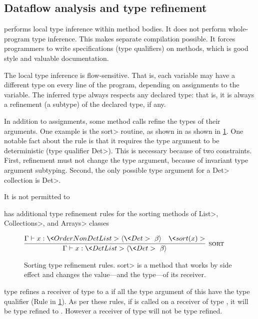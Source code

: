 \subsection{Dataflow analysis and type refinement}\label{dataflow}
\TheDeterminismChecker performs local type inference within method bodies.
It does not perform whole-program type inference.
This makes separate compilation possible.
It forces programmers to write specifications (type qualifiers) on methods,
which is good style and valuable documentation.

The local type inference is flow-sensitive.  That is, each variable may
have a different type on every line of the program, depending on
assignments to the variable.  The inferred type always respects any
declared type:  that is, it is always a refinement (a subtype) of the
declared type, if any.

In addition to assignments, some method calls refine the types of their
arguments.  One example is the \<sort> routine, as shown in 
as shown in \cref{fig-sorting}.  One notable fact about the 
rule is that it requires the type argument to be deterministic (type
qualifier \<Det>).  This is necessary because of two constraints.
First, refinement must not change the type argument, because of invariant
type argument subtyping.
Second, the only possible type argument for a \<Det> collection is \<Det>.


It is not permitted to 




\TheDeterminismChecker has additional type refinement rules for the sorting
methods of \<List>, \<Collections>, and \<Arrays> classes
\begin{figure}
%     
    
  $\infer[\rulename{sort}]
  {\Gamma \vdash x : \<Det List>\angles{\<Det>\ \beta}}
  {\Gamma \vdash x : \<OrderNonDet List>\angles{\<Det>\ \beta} & \<sort(x)>}$
    
%     
    
    \caption{Sorting type refinement rules.  \<sort> is a method that works
    by side effect and changes the value---and the type---of its receiver.}
    \label{fig-sorting}
\end{figure}
\TheDeterminismChecker type refines a receiver of type  to a  if all the
type argument of this  have the type qualifier  (Rule  in \cref{fig-sorting}).
As per these rules, if  is called on a receiver of type , it will
be type refined to . However a receiver of type  will not be type refined.


